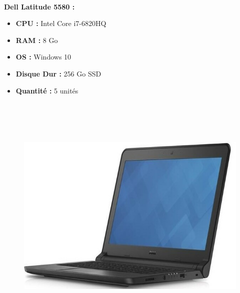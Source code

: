 \documentclass[11pt,a4paper,twoside]{article}
\begin{document}
\paragraph{}\textbf{Dell Latitude 5580 :} \\
\begin{itemize}
\item \textbf{CPU :} Intel Core i7-6820HQ
\item \textbf{RAM :} 8 Go
\item \textbf{OS :} Windows 10
\item \textbf{Disque Dur :} 256 Go SSD
\item \textbf{Quantité :} 5 unités
\\ \\ \\ \\ \\
\end{itemize}
\begin{figure}
\includegraphics[scale=0.4]{Ressources/Materiel/L3340.jpg}\vspace{-2cm}
\end{figure}
\end{document}
